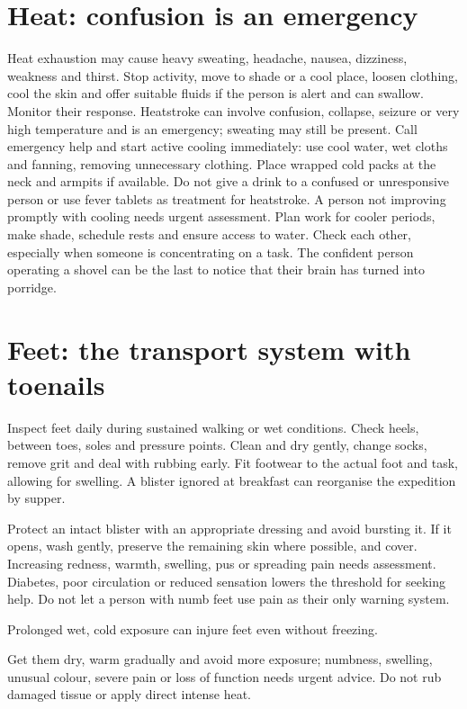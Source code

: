 \documentclass[10pt,openright]{book}
\begin{document}
\section*{Heat: confusion is an emergency}
Heat exhaustion may cause heavy sweating, headache, nausea, dizziness, weakness and thirst. Stop activity, move to shade or a cool place, loosen clothing, cool the skin and offer suitable fluids if the person is alert and can swallow. Monitor their response. Heatstroke can involve confusion, collapse, seizure or very high temperature and is an emergency; sweating may still be present. Call emergency help and start active cooling immediately: use cool water, wet cloths and fanning, removing unnecessary clothing. Place wrapped cold packs at the neck and armpits if available. Do not give a drink to a confused or unresponsive person or use fever tablets as treatment for heatstroke. A person not improving promptly with cooling needs urgent assessment. Plan work for cooler periods, make shade, schedule rests and ensure access to water. Check each other, especially when someone is concentrating on a task. The confident person operating a shovel can be the last to notice that their brain has turned into porridge.

\section*{Feet: the transport system with toenails}
Inspect feet daily during sustained walking or wet conditions. Check heels, between toes, soles and pressure points. Clean and dry gently, change socks, remove grit and deal with rubbing early. Fit footwear to the actual foot and task, allowing for swelling. A blister ignored at breakfast can reorganise the expedition by supper.

Protect an intact blister with an appropriate dressing and avoid bursting it. If it opens, wash gently, preserve the remaining skin where possible, and cover. Increasing redness, warmth, swelling, pus or spreading pain needs assessment. Diabetes, poor circulation or reduced sensation lowers the threshold for seeking help. Do not let a person with numb feet use pain as their only warning system.

Prolonged wet, cold exposure can injure feet even without freezing.

Get them dry, warm gradually and avoid more exposure; numbness, swelling, unusual colour, severe pain or loss of function needs urgent advice. Do not rub damaged tissue or apply direct intense heat.
\end{document}
